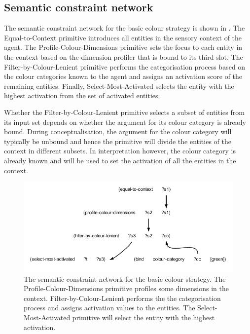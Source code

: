 \subsection{Semantic constraint network}

The semantic constraint network for the basic colour strategy is shown
in . The {\sc
  Equal-to-Context} primitive introduces all entities in the sensory
context of the agent. The {\sc Profile-Colour-Dimensions} primitive
sets the focus to each entity in the context based on the dimension
profiler that is bound to its third slot. The {\sc
  Filter-by-Colour-Lenient} primitive performs the categorisation
process based on the colour categories known to the agent and assigns
an activation score of the remaining entities. Finally, {\sc
  Select-Most-Activated} selects the entity with the highest
activation from the set of activated entities.

Whether the {\sc Filter-by-Colour-Lenient} primitive selects a subset
of entities from its input set depends on whether the argument for its
colour category is already bound. During conceptualisation, the
argument for the colour category will typically be unbound and hence
the primitive will divide the entities of the context in different
subsets. In interpretation however, the colour category is already
known and will be used to set the activation of all the entities in
the context.

\begin{figure}
  \begin{center}
    \includegraphics[width=.8\textwidth]{./basic-strategy/figures/semantics-interpretation.pdf}
    \caption[The semantic constraint network for the basic colour
    strategy]{The semantic constraint network for the basic colour
      strategy. The {\sc Profile-Colour-Dimensions} primitive profiles
      some dimensions in the context. {\sc Filter-by-Colour-Lenient}
      performs the the categorisation process and assigns activation
      values to the entities. The {\sc Select-Most-Activated}
      primitive will select the entity with the highest activation.}
    \label{f:bcs-semantic-structure}
  \end{center}
\end{figure}

